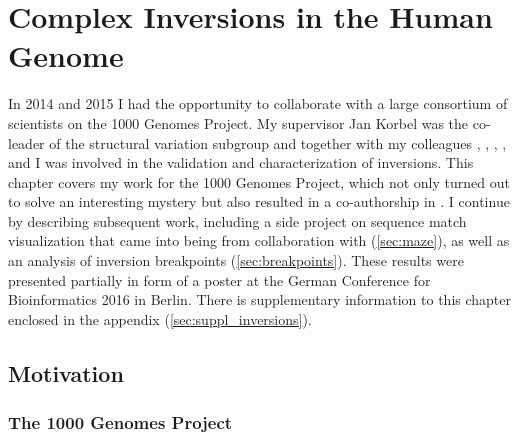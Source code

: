 \chapter{Complex Inversions in the Human Genome}
\label{sec:complex_invs}


In 2014 and 2015 I had the opportunity to collaborate with a large consortium of
scientists on the 1000 Genomes Project. My supervisor Jan Korbel was the
co-leader of the structural variation subgroup and together with my colleagues
\tobias, \adrian, \benjamin, \markus, and \andreas
I was involved in the validation and characterization of inversions.
This chapter covers my work for the 1000 Genomes Project, which not only turned
out to solve an interesting mystery but also resulted in a co-authorship in
\citet{Sudmant2015}. I continue by describing subsequent work, including a side
project on sequence match visualization that came into being from collaboration
with \markus (\cref{sec:maze}), as well as an analysis of inversion breakpoints
(\cref{sec:breakpoints}). These results were presented partially in form of a
poster at the German Conference for
Bioinformatics 2016 in Berlin. There is supplementary information to this
chapter enclosed in the appendix (\cref{sec:suppl_inversions}).





\section{Motivation}
\subsection{The 1000 Genomes Project}
\label{sec:1000G}

